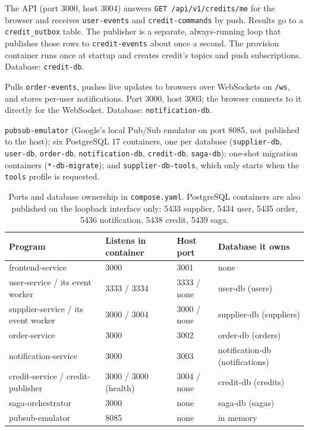 \documentclass[11pt,a4paper]{article}
\newcommand{\code}[1]{\nolinkurl{#1}}
\begin{document}
\begin{description}[style=nextline, leftmargin=0pt, labelsep=0pt, itemsep=4pt]
\item[\code{credit-service}, \code{credit-publisher} and \code{credit-pubsub-provision}]
The API (port 3000, host 3004) answers \code{GET /api/v1/credits/me} for the browser and
receives \code{user-events} and \code{credit-commands} by push. Results go to a
\code{credit_outbox} table. The publisher is a separate, always-running loop that
publishes those rows to \code{credit-events} about once a second. The provision container
runs once at startup and creates credit's topics and push subscriptions. Database:
\code{credit-db}.

\item[\code{notification-service}] Pulls \code{order-events}, pushes live updates to
browsers over WebSockets on \code{/ws}, and stores per-user notifications. Port 3000,
host 3003; the browser connects to it directly for the WebSocket. Database:
\code{notification-db}.

\item[Infrastructure] \code{pubsub-emulator} (Google's local Pub/Sub emulator on port
8085, not published to the host); six PostgreSQL 17 containers, one per database
(\code{supplier-db}, \code{user-db}, \code{order-db}, \code{notification-db},
\code{credit-db}, \code{saga-db}); one-shot migration containers (\code{*-db-migrate});
and \code{supplier-db-tools}, which only starts when the \code{tools} profile is
requested.
\end{description}

\begin{table}[!htbp]
\centering\small
\begin{tabular}{@{}llll@{}}
\toprule
Program & Listens in container & Host port & Database it owns\\
\midrule
frontend-service & 3000 & 3001 & none\\
user-service / its event worker & 3333 / 3334 & 3333 / none & user-db (users)\\
supplier-service / its event worker & 3000 / 3004 & 3000 / none & supplier-db (suppliers)\\
order-service & 3000 & 3002 & order-db (orders)\\
notification-service & 3000 & 3003 & notification-db (notifications)\\
credit-service / credit-publisher & 3000 / 3000 (health) & 3004 / none & credit-db (credits)\\
saga-orchestrator & 3000 & none & saga-db (sagas)\\
pubsub-emulator & 8085 & none & in memory\\
\bottomrule
\end{tabular}
\caption{Ports and database ownership in \code{compose.yaml}. PostgreSQL containers are
also published on the loopback interface only: 5433 supplier, 5434 user, 5435 order,
5436 notification, 5438 credit, 5439 saga.}
\label{tab:ports}
\end{table}
\end{document}
